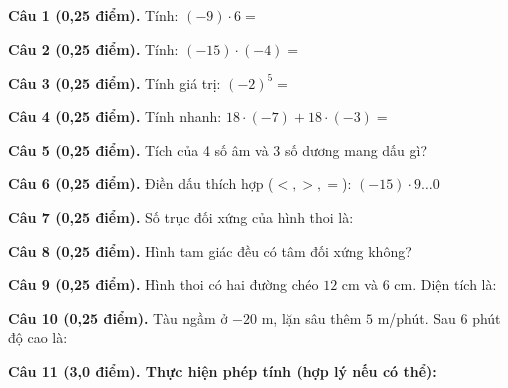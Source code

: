 \documentclass[12pt,a4paper]{article}
\begin{document}
\vspace{1.0mm}
\noindent\textbf{Câu 1 (0,25 điểm).} Tính: $(-9) \cdot 6 =$ \par\vspace{0.25mm}
\noindent\textbf{Câu 2 (0,25 điểm).} Tính: $(-15) \cdot (-4) =$ \par\vspace{0.25mm}
\noindent\textbf{Câu 3 (0,25 điểm).} Tính giá trị: $(-2)^5 =$ \par\vspace{0.25mm}
\noindent\textbf{Câu 4 (0,25 điểm).} Tính nhanh: $18 \cdot (-7) + 18 \cdot (-3) =$ \par\vspace{0.25mm}
\noindent\textbf{Câu 5 (0,25 điểm).} Tích của 4 số âm và 3 số dương mang dấu gì? \par\vspace{0.25mm}
\noindent\textbf{Câu 6 (0,25 điểm).} Điền dấu thích hợp ($<, >, =$): $(-15) \cdot 9 \dots 0$ \shortans{<}\par\vspace{0.25mm}
\noindent\textbf{Câu 7 (0,25 điểm).} Số trục đối xứng của hình thoi là: \par\vspace{0.25mm}
\noindent\textbf{Câu 8 (0,25 điểm).} Hình tam giác đều có tâm đối xứng không? \par\vspace{0.25mm}
\noindent\textbf{Câu 9 (0,25 điểm).} Hình thoi có hai đường chéo $12\text{ cm}$ và $6\text{ cm}$. Diện tích là: \par\vspace{0.25mm}
\noindent\textbf{Câu 10 (0,25 điểm).} Tàu ngầm ở $-20\text{ m}$, lặn sâu thêm $5\text{ m}$/phút. Sau 6 phút độ cao là: \par\vspace{0.25mm}

\vspace{0.3mm}
\noindent\textbf{Câu 11 (3,0 điểm). Thực hiện phép tính (hợp lý nếu có thể):}
\vspace{0.4mm}
\end{document}
